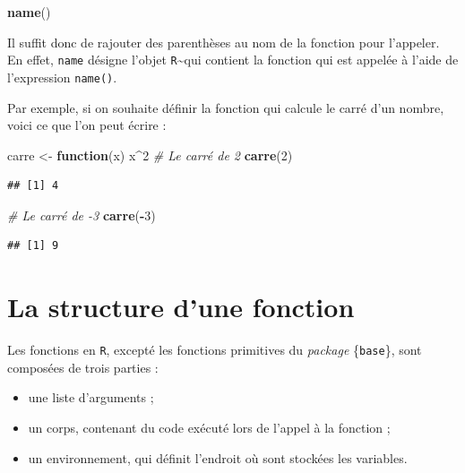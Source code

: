 \documentclass[
  11pt,
]{book}
\newenvironment{Shaded}{\begin{snugshade}}{\end{snugshade}}
\newcommand{\CommentTok}[1]{\textcolor[rgb]{0.56,0.35,0.01}{\textit{#1}}}
\newcommand{\ControlFlowTok}[1]{\textcolor[rgb]{0.13,0.29,0.53}{\textbf{#1}}}
\newcommand{\DecValTok}[1]{\textcolor[rgb]{0.00,0.00,0.81}{#1}}
\newcommand{\KeywordTok}[1]{\textcolor[rgb]{0.13,0.29,0.53}{\textbf{#1}}}
\newcommand{\NormalTok}[1]{#1}
\newcommand{\OperatorTok}[1]{\textcolor[rgb]{0.81,0.36,0.00}{\textbf{#1}}}
\newcommand{\StringTok}[1]{\textcolor[rgb]{0.31,0.60,0.02}{#1}}
\providecommand{\tightlist}{%
  \setlength{\itemsep}{0pt}\setlength{\parskip}{0pt}}
\numberwithin{equation}{section}
\numberwithin{countremarque}{section}
\begin{document}
\begin{Shaded}
\begin{Highlighting}[]
\KeywordTok{name}\NormalTok{()}
\end{Highlighting}
\end{Shaded}

Il suffit donc de rajouter des parenthèses au nom de la fonction pour l'appeler. En effet, \texttt{name} désigne l'objet \texttt{R}\textasciitilde qui contient la fonction qui est appelée à l'aide de l'expression \texttt{name()}.

Par exemple, si on souhaite définir la fonction qui calcule le carré d'un nombre, voici ce que l'on peut écrire :

\begin{Shaded}
\begin{Highlighting}[]
\NormalTok{carre \textless{}{-}}\StringTok{ }\ControlFlowTok{function}\NormalTok{(x) x}\OperatorTok{\^{}}\DecValTok{2}
\CommentTok{\# Le carré de 2}
\KeywordTok{carre}\NormalTok{(}\DecValTok{2}\NormalTok{)}
\end{Highlighting}
\end{Shaded}

\begin{lstlisting}
## [1] 4
\end{lstlisting}

\begin{Shaded}
\begin{Highlighting}[]
\CommentTok{\# Le carré de {-}3}
\KeywordTok{carre}\NormalTok{(}\OperatorTok{{-}}\DecValTok{3}\NormalTok{)}
\end{Highlighting}
\end{Shaded}

\begin{lstlisting}
## [1] 9
\end{lstlisting}

\hypertarget{fonctions_structure}{%
\section{La structure d'une fonction}\label{fonctions_structure}}

Les fonctions en \texttt{R}, excepté les fonctions primitives du \emph{package} \{\texttt{base}\}, sont composées de trois parties :

\begin{itemize}
\tightlist
\item
  une liste d'arguments ;
\item
  un corps, contenant du code exécuté lors de l'appel à la fonction ;
\item
  un environnement, qui définit l'endroit où sont stockées les variables.
\end{itemize}
\end{document}
